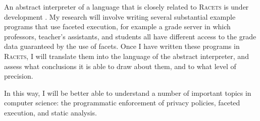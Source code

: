 \documentclass{article}
\begin{document}
An abstract interpreter of a language that is closely related to \textsc{Racets} is under development \cite{abstract-inter}. My research will involve writing several substantial example programs that use faceted execution, for example a grade server in which professors, teacher's assistants, and students all have different access to the grade data guaranteed by the use of facets. Once I have written these programs in \textsc{Racets}, I will translate them into the language of the abstract interpreter, and assess what conclusions it is able to draw about them, and to what level of precision.

In this way, I will be better able to understand a number of important topics in computer science: the programmatic enforcement of privacy policies, faceted execution, and static analysis.


\end{document}
